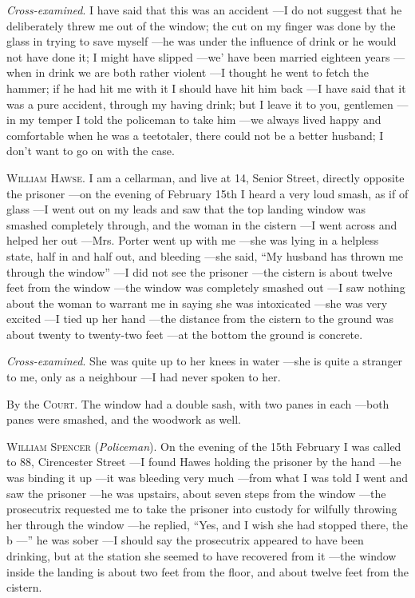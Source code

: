 {    \textit{Cross-examined}. I have said that this was an accident
    ---I do not suggest that he deliberately threw me out of the window; the cut on my finger was done by the glass in trying to save myself
    ---he was under the influence of drink or he would not have done it; I might have slipped
    ---we' have been married eighteen years
    ---when in drink we are both rather violent
    ---I thought he went to fetch the hammer; if he had hit me with it I should have hit him back
    ---I have said that it was a pure accident, through my having drink; but I leave it to you, gentlemen
    ---in my temper I told the policeman to take him
    ---we always lived happy and comfortable when he was a teetotaler, there could not be a better husband; I don't want to go on with the case.

    \textsc{William Hawse}. I am a cellarman, and live at 14, Senior Street, directly opposite the prisoner
    ---on the evening of February 15th I heard a very loud smash, as if of glass
    ---I went out on my leads and saw that the top landing window was smashed completely through, and the woman in the cistern
    ---I went across and helped her out
    ---Mrs. Porter went up with me
    ---she was lying in a helpless state, half in and half out, and bleeding
    ---she said, ``My husband has thrown me through the window''
    ---I did not see the prisoner
    ---the cistern is about twelve feet from the window
    ---the window was completely smashed out
    ---I saw nothing about the woman to warrant me in saying she was intoxicated
    ---she was very excited
    ---I tied up her hand
    ---the distance from the cistern to the ground was about twenty to twenty-two feet
    ---at the bottom the ground is concrete.

    \textit{Cross-examined}. She was quite up to her knees in water
    ---she is quite a stranger to me, only as a neighbour
    ---I had never spoken to her.

    By the \textsc{Court}. The window had a double sash, with two panes in each
    ---both panes were smashed, and the woodwork as well.

    \textsc{William Spencer} (\textit{Policeman}). On the evening of the 15th February I was called to 88, Cirencester Street
    ---I found Hawes holding the prisoner by the hand
    ---he was binding it up
    ---it was bleeding very much
    ---from what I was told I went and saw the prisoner
    ---he was upstairs, about seven steps from the window
    ---the prosecutrix requested me to take the prisoner into custody for wilfully throwing her through the window
    ---he replied, ``Yes, and I wish she had stopped there, the b
    ---'' he was sober
    ---I should say the prosecutrix appeared to have been drinking, but at the station she seemed to have recovered from it
    ---the window inside the landing is about two feet from the floor, and about twelve feet from the cistern.

}
